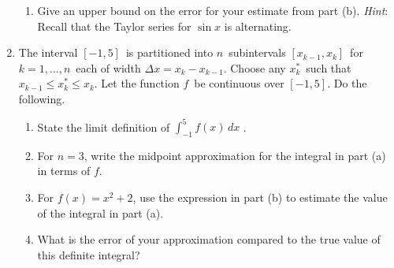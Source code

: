 \documentclass[10pt]{article}
\begin{document}
\begin{enumerate}
\begin{enumerate}
\item Give an upper bound on the error for your estimate from part (b). \emph{Hint}: Recall that the Taylor series for $\sin x$ is alternating.

\end{enumerate}

\item The interval $[-1,5]$\ is partitioned into $n$\ subintervals $[x_{k-1}, x_k]$\ for $k=1,...,n$\ each of width $\Delta x=x_k-x_{k-1}$. Choose any $x_k^*$\ such that $x_{k-1}\le x_k^*\le x_k$. Let the function $f$\ be continuous over $[-1,5]$. Do the following. 
\begin{enumerate}
\item State the limit definition of $\displaystyle\int_{-1}^{5}{f(x)}\,dx$ .

\item For $n=3$, write the midpoint approximation for the integral in part (a) in terms of $f$.

\item For $f(x)=x^2+2$, use the expression in part (b) to estimate the value of the integral in part (a).

\item What is the error of your approximation compared to the true value of this definite integral?
\end{enumerate}

\end{enumerate}
\end{document}
